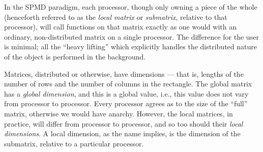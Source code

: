In the SPMD paradigm, each processor, though only owning a piece of the whole (henceforth referred to as the \emph{local matrix} or \emph{submatrix}, relative to that processor), will call functions on that matrix exactly as one would with an ordinary, non-distributed matrix on a single processor.  The difference for the user is minimal; all the ``heavy lifting'' which explicitly handles the distributed nature of the object is performed in the background.

Matrices, distributed or otherwise, have dimensions --- that is, lengths of the number of rows and the number of columns in the rectangle.  The global matrix has a \emph{global dimension}, and this is a global value, i.e., this value does not vary from processor to processor.  Every processor agrees as to the size of the ``full'' matrix, otherwise we would have anarchy.  However, the local matrices, in practice, will differ from processor to processor, and so too should their \emph{local dimensions}.  A local dimension, as the name implies, is the dimension of the submatrix, relative to a particular processor.


